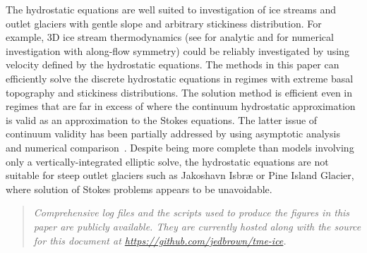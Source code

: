 The hydrostatic equations are well suited to investigation of ice streams and outlet glaciers with gentle slope and arbitrary stickiness distribution.
For example, 3D ice stream thermodynamics (see \citet{raymond2000energy} for analytic and \citet{truffer2003isbrae} for numerical investigation with along-flow symmetry) could be reliably investigated by using velocity defined by the hydrostatic equations.
The methods in this paper can efficiently solve the discrete hydrostatic equations in regimes with extreme basal topography and stickiness distributions.
The solution method is efficient even in regimes that are far in excess of where the continuum hydrostatic approximation is valid as an approximation to the Stokes equations.
The latter issue of continuum validity has been partially addressed by using asymptotic analysis~\citep{schoof2010thin} and numerical comparison~\citep{hindmarsh2004numerical,pattyn2008beh}.
Despite being more complete than models involving only a vertically-integrated elliptic solve, the hydrostatic equations are not suitable for steep outlet glaciers such as Jakoshavn Isbr{\ae} or Pine Island Glacier, where solution of Stokes problems appears to be unavoidable.

\medskip
\begin{quote}\it
  Comprehensive log files and the scripts used to produce the figures in this paper are publicly available.
  They are currently hosted along with the source for this document at \url{https://github.com/jedbrown/tme-ice}.
\end{quote}
